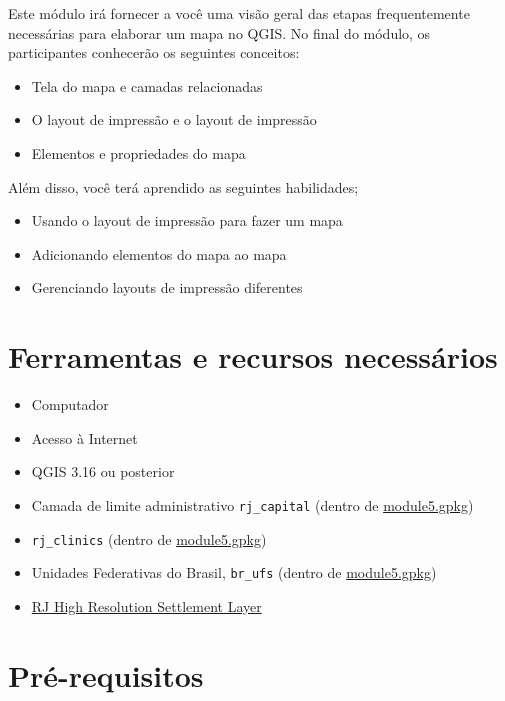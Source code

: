 \documentclass[
]{book}
\providecommand{\tightlist}{%
  \setlength{\itemsep}{0pt}\setlength{\parskip}{0pt}}
\begin{document}
Este módulo irá fornecer a você uma visão geral das etapas frequentemente necessárias para elaborar um mapa no QGIS. No final do módulo, os participantes conhecerão os seguintes conceitos:

\begin{itemize}
\tightlist
\item
  Tela do mapa e camadas relacionadas
\item
  O layout de impressão e o layout de impressão
\item
  Elementos e propriedades do mapa
\end{itemize}

Além disso, você terá aprendido as seguintes habilidades;

\begin{itemize}
\tightlist
\item
  Usando o layout de impressão para fazer um mapa
\item
  Adicionando elementos do mapa ao mapa
\item
  Gerenciando layouts de impressão diferentes
\end{itemize}

\hypertarget{ferramentas-e-recursos-necessuxe1rios-5}{%
\section{Ferramentas e recursos necessários}\label{ferramentas-e-recursos-necessuxe1rios-5}}

\begin{itemize}
\tightlist
\item
  Computador
\item
  Acesso à Internet
\item
  QGIS 3.16 ou posterior
\item
  Camada de limite administrativo \texttt{rj\_capital} (dentro de \href{data/module5.gpkg}{module5.gpkg})
\item
  \texttt{rj\_clinics} (dentro de \href{data/module5.gpkg}{module5.gpkg})
\item
  Unidades Federativas do Brasil, \texttt{br\_ufs} (dentro de \href{data/module5.gpkg}{module5.gpkg})
\item
  \href{data/hrsl_rj_capital_populacao.tif}{RJ High Resolution Settlement Layer}
\end{itemize}

\hypertarget{pruxe9-requisitos-5}{%
\section{Pré-requisitos}\label{pruxe9-requisitos-5}}
\end{document}
